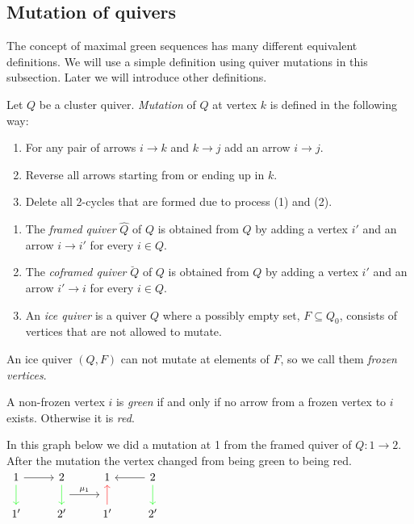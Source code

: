 \subsection{Mutation of quivers}
\indent The concept of maximal green sequences has many different equivalent definitions. We will use a simple definition using quiver mutations in this subsection. Later we will introduce other definitions.\\
\begin{definition}
Let $Q$ be a cluster quiver. \textit{Mutation} of $Q$ at vertex $k$ is defined in the following way:
\begin{enumerate}
\item For any pair of arrows $i\to k$ and $k\to j$ add an arrow $i\to j$.
\item Reverse all arrows starting from or ending up in $k$.
\item Delete all 2-cycles that are formed due to process (1) and (2).
\end{enumerate}
\end{definition}
\begin{definition}
\begin{enumerate}
\item The \textit{framed quiver} $\hat{Q}$ of $Q$ is obtained from $Q$ by adding a vertex $i'$ and an arrow $i\rightarrow i'$ for every $i\in Q$.
\item The \textit{coframed quiver} $\breve{Q}$ of $Q$ is obtained from $Q$ by adding a vertex $i'$ and an arrow $i'\rightarrow i$ for every $i\in Q$.
\item An \textit{ice quiver} is a quiver $Q$ where a possibly empty set, $F\subseteq Q_0$, consists of vertices that are not allowed to mutate.
\end{enumerate}
\end{definition}
\indent An ice quiver $(Q,F)$ can not mutate at elements of $F$, so we call them \textit{frozen vertices}.
\begin{definition}
A non-frozen vertex $i$ is \textit{green} if and only if no arrow from a frozen vertex to $i$ exists. Otherwise it is \textit{red}.\cite{Kel11}
\end{definition}
\begin{example}
\indent In this graph below we did a mutation at 1 from the framed quiver of $Q: 1\to 2$. After the mutation the vertex changed from being green to being red.\\
$\begin{tikzcd}
1 \arrow[r] \arrow[green]{d} & 2\arrow[green]{d}\arrow[r,"\mu_1", shift right=3.5ex]  & 1&2\arrow[l]\arrow[green]{d}\\
1' & 2'&1'\arrow[red]{u}& 2'\\
\end{tikzcd}$
\end{example}

